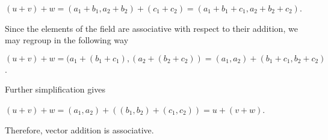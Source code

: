 \documentclass[12pt, a4paper]{article}
\begin{document}
\begin{description}
\vspace{4mm}

\centerline{$(u+v)+w=(a_1+b_1,a_2+b_2)+(c_1+c_2)=(a_1+b_1+c_1,a_2+b_2+c_2)$.}

\vspace{4mm}

Since the elements of the field are associative with respect to their addition, we may regroup in the following way\par

\vspace{4mm}

\centerline{$(u+v)+w=(a_1+(b_1+c_1),(a_2+(b_2+c_2))=(a_1,a_2)+(b_1+c_1,b_2+c_2)$.}

\vspace{4mm}

Further simplification gives\par

\vspace{4mm}

\centerline{$(u+v)+w=(a_1,a_2)+((b_1,b_2)+(c_1,c_2))=u+(v+w)$.}

\vspace{4mm}

Therefore, vector addition is associative.

\vspace{4mm}



\end{description}
\end{document}
